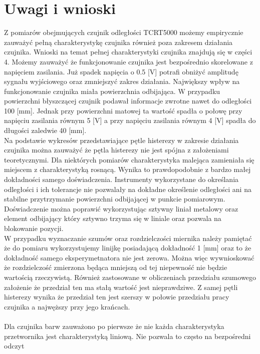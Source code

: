 \documentclass[11pt]{article}
\begin{document}
    \section{Uwagi i wnioski}
    Z pomiarów obejmujących czujnik odległości TCRT5000 możemy empirycznie zauważyć pełną charakterystykę czujnika
    również poza zakresem działania czujnika. Wnioski na temat pełnej charakterystyki czujnika znajdują się w części 4.
    Możemy zauważyć że funkcjonowanie czujnika jest bezpośrednio skorelowane z napięciem zasilania. Już spadek napięcia o 0.5 [V] potrafi obniżyć amplitudę
    sygnału wyjściowego oraz zmniejszyć zakres działania. Największy wpływ na funkcjonowanie czujnika miała powierzchnia odbijająca. W przypadku powierzchni
    błyszczącej czujnik podawał informacje zwrotne nawet do odległości 100 [mm]. Jednak przy powierzchni matowej ta wartość spadła o połowę przy napięciu zasilania
    równym 5 [V] a przy napięciu zasilania równym 4 [V] spadła do długości zaledwie 40 [mm].\\
    \indent Na podstawie wykresów przedstawiające pętle histerezy w zakresie działania czujnika można zauważyć że pętla histerezy nie jest spójna z założeniami teoretycznymi.
    Dla niektórych pomiarów charakterystyka malejąca zamieniała się miejscem z charakterystyką rosnącą. Wynika to prawdopodobnie z bardzo małej dokładności samego doświadczenia.
    Instrumenty wykorzystane do określania odległości i ich tolerancje nie pozwalały na dokładne określenie odległości ani na stabilne przytrzymanie powierzchni odbijającej w punkcie
    pomiarowym. Doświadczenie można poprawić wykorzystując sztywny liniał metalowy oraz element odbijający który sztywno trzyma się w liniale oraz pozwala na blokowanie pozycji.\\
    \indent W przypadku wyznaczanie szumów oraz rozdzielczości miernika należy pamiętać że do pomiaru wykorzystujemy linijkę posiadającą dokładność 1 [mm] oraz to że dokładność
    samego eksperymetnatora nie jest zerowa. Można więc wywnioskować że rozdzielczość zmierzona będąca mniejszą od tej niepewność nie będzie wartością rzeczywistą. Również
    zastosowane w obliczeniach przedziału szumowego założenie że przedział ten ma stałą wartość jest nieprawdziwe. Z samej pętli histerezy wynika że przedział ten jest szerszy w połowie
    przedziału pracy czujnika a najwęższy przy jego krańcach.\\
    \\
    \indent Dla czujnika barw zauważono po pierwsze że nie każda charakterystyka przetwornika jest charakterystyką liniową. Nie pozwala to często na bezpośredni odczyt
\end{document}
